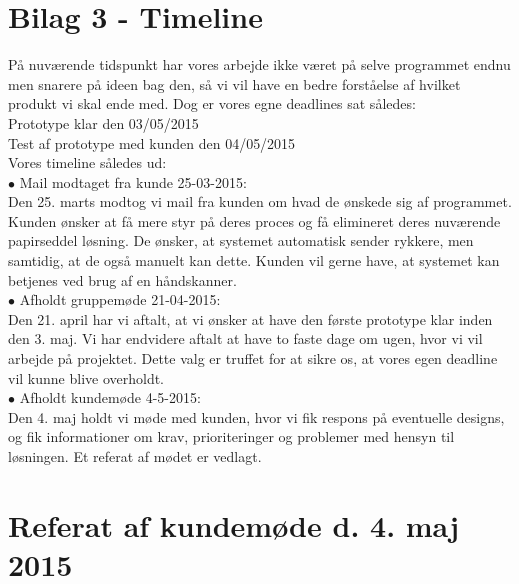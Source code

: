 \documentclass[a4paper]{article}
\begin{document}
\section{Bilag 3 - Timeline}
På nuværende tidspunkt har vores arbejde ikke været på selve programmet endnu men snarere på ideen bag den, så vi vil have en bedre forståelse af hvilket produkt vi skal ende med. Dog er vores egne deadlines sat således:\\
Prototype klar den 03/05/2015 \\
Test af prototype med kunden den 04/05/2015\\
Vores timeline således ud:\\
$\bullet$ Mail modtaget fra kunde 25-03-2015:\\
Den 25. marts modtog vi mail fra kunden om hvad de ønskede sig af programmet. Kunden ønsker at få mere styr på deres proces og få elimineret deres nuværende papirseddel løsning. De ønsker, at systemet automatisk sender rykkere, men samtidig, at de også manuelt kan dette. Kunden vil gerne have, at systemet kan betjenes ved brug af en håndskanner.\\
$\bullet$ Afholdt gruppemøde 21-04-2015:\\
Den 21. april har vi aftalt, at vi ønsker at have den første prototype klar inden den 3. maj. Vi har endvidere aftalt at have to faste dage om ugen, hvor vi vil arbejde på projektet. Dette valg er truffet for at sikre os, at vores egen deadline vil kunne blive overholdt.\\
$\bullet$ Afholdt kundemøde 4-5-2015:\\
Den 4. maj holdt vi møde med kunden, hvor vi fik respons på eventuelle designs, og fik informationer om krav, prioriteringer og problemer med hensyn til løsningen. Et referat af mødet er vedlagt.
\pagebreak
\section{Referat af kundemøde d. 4. maj 2015}
\end{document}
